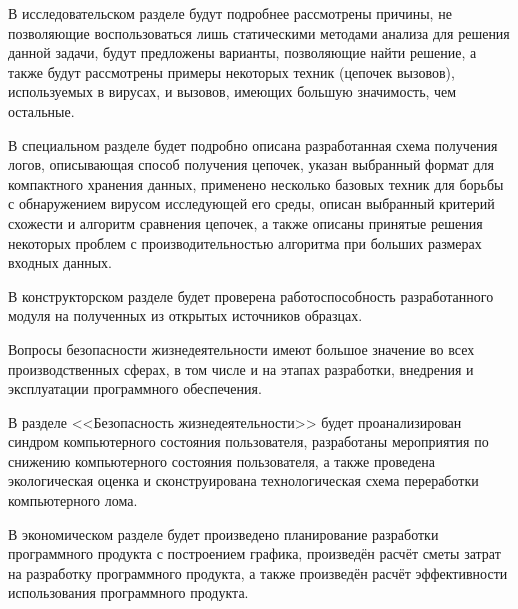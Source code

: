 В исследовательском разделе будут подробнее рассмотрены причины, не позволяющие воспользоваться лишь статическими методами анализа для решения данной задачи, будут предложены варианты, позволяющие найти решение, а также будут рассмотрены примеры некоторых техник (цепочек вызовов), используемых в вирусах, и вызовов, имеющих большую значимость, чем остальные.

В специальном разделе будет подробно описана разработанная схема получения логов, описывающая способ получения цепочек, указан выбранный формат для компактного хранения данных, применено несколько базовых техник для борьбы с обнаружением вирусом исследующей его среды, описан выбранный критерий схожести и алгоритм сравнения цепочек, а также описаны принятые решения некоторых проблем с производительностью алгоритма при больших размерах входных данных.

В конструкторском разделе будет проверена работоспособность разработанного модуля на полученных из открытых источников образцах.

Вопросы безопасности жизнедеятельности имеют большое значение во всех производственных сферах, в том числе и на этапах разработки, внедрения и эксплуатации программного обеспечения.

В разделе <<Безопасность жизнедеятельности>> будет проанализирован синдром компьютерного состояния пользователя, разработаны мероприятия по снижению компьютерного состояния пользователя, а также проведена экологическая оценка и сконструирована технологическая схема переработки компьютерного лома.

В экономическом разделе будет произведено планирование разработки программного продукта с построением графика, произведён расчёт сметы затрат на разработку программного продукта, а также произведён расчёт эффективности использования программного продукта.